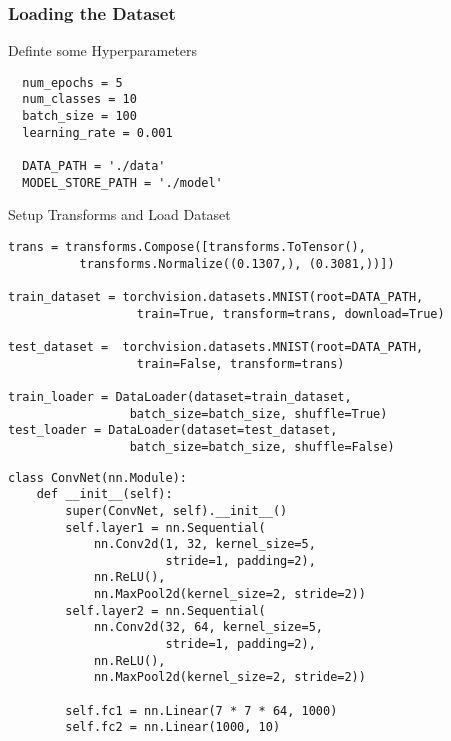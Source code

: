 \documentclass[14 pt]{beamer}
\begin{document}
\begin{frame}[fragile]
  \frametitle{Loading the Dataset}
  \begin{block}{Definte some Hyperparameters}
\begin{verbatim}
  num_epochs = 5
  num_classes = 10
  batch_size = 100
  learning_rate = 0.001

  DATA_PATH = './data'
  MODEL_STORE_PATH = './model'
\end{verbatim}
  \end{block}
\end{frame}

\begin{frame}[fragile]{}
\footnotesize{
  \begin{block}{Setup Transforms and Load Dataset}
\begin{verbatim}
trans = transforms.Compose([transforms.ToTensor(), 
          transforms.Normalize((0.1307,), (0.3081,))])

train_dataset = torchvision.datasets.MNIST(root=DATA_PATH, 
                  train=True, transform=trans, download=True)

test_dataset =  torchvision.datasets.MNIST(root=DATA_PATH, 
                  train=False, transform=trans)

train_loader = DataLoader(dataset=train_dataset, 
                 batch_size=batch_size, shuffle=True)
test_loader = DataLoader(dataset=test_dataset, 
                 batch_size=batch_size, shuffle=False)
\end{verbatim}
  \end{block}
}
\end{frame}


\begin{frame}[fragile]{}
\footnotesize{
  \begin{block}{}
\begin{verbatim}
class ConvNet(nn.Module):
    def __init__(self):
        super(ConvNet, self).__init__()
        self.layer1 = nn.Sequential(
            nn.Conv2d(1, 32, kernel_size=5, 
                      stride=1, padding=2),
            nn.ReLU(),
            nn.MaxPool2d(kernel_size=2, stride=2))
        self.layer2 = nn.Sequential(
            nn.Conv2d(32, 64, kernel_size=5, 
                      stride=1, padding=2),
            nn.ReLU(),
            nn.MaxPool2d(kernel_size=2, stride=2))

        self.fc1 = nn.Linear(7 * 7 * 64, 1000)
        self.fc2 = nn.Linear(1000, 10)
\end{verbatim}
  \end{block}
}
\end{frame}
\end{document}
